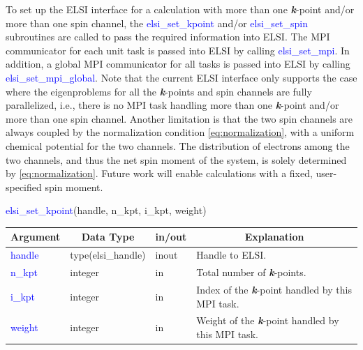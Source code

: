 \documentclass{report}
\begin{document}
To set up the ELSI interface for a calculation with more than one \textbf{\textit{k}}-point and/or more than one spin channel,  the \textcolor{blue}{elsi\_set\_kpoint} and/or \textcolor{blue}{elsi\_set\_spin} subroutines are called to pass the required information into ELSI.  The MPI communicator for each unit task is passed into ELSI by calling \textcolor{blue}{elsi\_set\_mpi}.  In addition, a global MPI communicator for all tasks is passed into ELSI by calling \textcolor{blue}{elsi\_set\_mpi\_global}.  Note that the current ELSI interface only supports the case where the eigenproblems for all the \textbf{\textit{k}}-points and spin channels are fully parallelized, i.e., there is no MPI task handling more than one \textbf{\textit{k}}-point and/or more than one spin channel.  Another limitation is that the two spin channels are always coupled by the normalization condition \ref{eq:normalization}, with a uniform chemical potential for the two channels.  The distribution of electrons among the two channels, and thus the net spin moment of the system, is solely determined by \ref{eq:normalization}.  Future work will enable calculations with a fixed, user-specified spin moment.\\

\begin{labeling}{\hspace{6cm}}
\item [\hspace{0.3cm} \textcolor{blue}{elsi\_set\_kpoint}(handle, n\_kpt, i\_kpt, weight)]
\end{labeling}

\begin{tabular}[]{|p{30mm}|p{30mm}|p{15mm}|p{90mm}|}
\hline
\multicolumn{1}{|c|}{\textbf{Argument}} & \multicolumn{1}{c|}{\textbf{Data Type}} & \multicolumn{1}{c|}{\textbf{in/out}} & \multicolumn{1}{c|}{\textbf{Explanation}}\\
\hline
\textcolor{blue}{handle} & type(elsi\_handle) & inout & Handle to ELSI.\\
\hline
\textcolor{blue}{n\_kpt} & integer            & in    & Total number of \textbf{\textit{k}}-points.\\
\hline
\textcolor{blue}{i\_kpt} & integer            & in    & Index of the \textbf{\textit{k}}-point handled by this MPI task.\\
\hline
\textcolor{blue}{weight} & integer            & in    & Weight of the \textbf{\textit{k}}-point handled by this MPI task.\\
\hline
\end{tabular}
\end{document}
